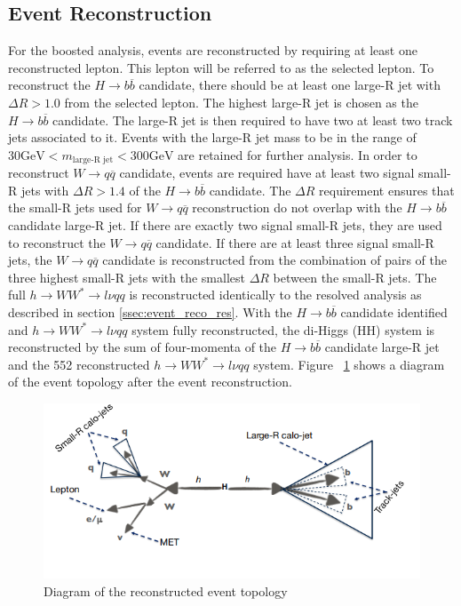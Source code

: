 \subsection{Event Reconstruction}
\label{sec:boosted_evtreco}
For the boosted analysis, events are reconstructed by requiring at least one reconstructed lepton. This lepton will be referred to as the selected lepton. To reconstruct the ${H\rightarrow b\overline{b}}$ candidate, there should be at least one large-R jet with ${\Delta{R} > 1.0}$ from the selected lepton. The highest \pT large-R jet is chosen as the ${H\rightarrow b\overline{b}}$ candidate. The large-R jet is then required to have two at least two track jets associated to it. Events with the large-R jet mass to be in the range of ${30 \mathrm{GeV} < m_{\textrm{large-R jet}} < 300 \mathrm{GeV}}$ are retained for further analysis.\newline
\indent In order to reconstruct ${W\rightarrow q\overline{q}}$ candidate, events are required have at least two signal small-R jets with ${\Delta{R} > 1.4}$ of the ${H\rightarrow b\overline{b}}$ candidate. The ${\Delta{R}}$ requirement ensures that the small-R jets used for ${W\rightarrow q\overline{q}}$ reconstruction do not overlap with the ${H\rightarrow b\overline{b}}$ candidate large-R jet. If there are exactly two signal small-R jets, they are used to reconstruct the ${W\rightarrow q\overline{q}}$ candidate. If there are at least three signal small-R jets, the ${W\rightarrow q\overline{q}}$ candidate is reconstructed from the combination of pairs of the three highest \pT small-R jets with the smallest ${\Delta{R}}$ between the small-R jets.\newline
\indent The full ${h\rightarrow WW^{*}\rightarrow l\nu qq}$ is reconstructed identically to the resolved analysis as described in section \ref{ssec:event_reco_res}.
With the ${H\rightarrow b\overline{b}}$ candidate identified and ${h\rightarrow WW^{*}\rightarrow l\nu qq}$ system fully reconstructed, the di-Higgs (HH) system is reconstructed by the sum of four-momenta of the ${H\rightarrow b\overline{b}}$ candidate large-R jet and the 552 reconstructed ${h\rightarrow WW^{*}\rightarrow l\nu qq}$ system. Figure ~\ref{fig:boost_topo} shows a diagram of the event topology after the event reconstruction.

\begin{figure}[h]
\begin{center}
\includegraphics[scale=0.65]{figures/boosted_topo}
\caption{Diagram of the reconstructed event topology}
\label{fig:boost_topo}
\end{center}
\end{figure}

